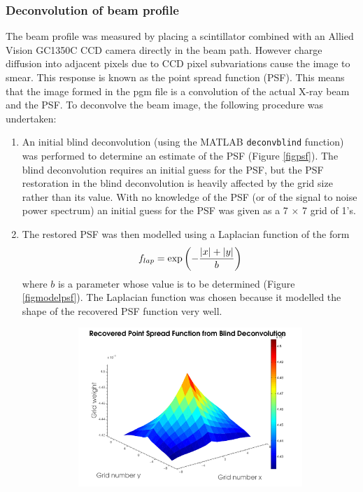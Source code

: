 \subsubsection{Deconvolution of beam profile}
\label{subs:Deconvolution of beam profile}
The beam profile was measured by placing a scintillator combined with an Allied Vision GC1350C CCD camera directly in the beam path.
However charge diffusion into adjacent pixels due to CCD pixel subvariations cause the image to smear.
This response is known as the point spread function (PSF).
This means that the image formed in the pgm file is a convolution of the actual X-ray beam and the PSF.
To deconvolve the beam image, the following procedure was undertaken:
\begin{enumerate}
\item An initial blind deconvolution (using the MATLAB \verb+deconvblind+ function) was performed to determine an estimate of the PSF (Figure \ref{figpsf}). The blind deconvolution requires an initial guess for the PSF, but the PSF restoration in the blind deconvolution is heavily affected by the grid size rather than its value. With no knowledge of the PSF (or of the signal to noise power spectrum) an initial guess for the PSF was given as a 7 $\times$ 7 grid of 1's.
\item The restored PSF was then modelled using a Laplacian function of the form
\begin{equation}
f_{lap} = \exp \left(-\frac{|x| + |y|}{b}\right)
\label{eqlap}
\end{equation}
where $b$ is a parameter whose value is to be determined (Figure \ref{figmodelpsf}). The Laplacian function was chosen because it modelled the shape of the recovered PSF function very well.
\begin{figure}
        \centering
        \begin{subfigure}[b]{0.9\textwidth}
                \centering
                \includegraphics[width=\textwidth]{figures/beam/Initial_psf.pdf}

\end{subfigure}
\end{figure}
\end{enumerate}
